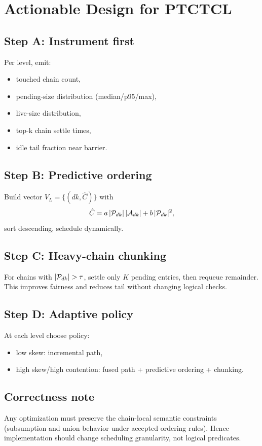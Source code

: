 \section{Actionable Design for PTCTCL}
\subsection*{Step A: Instrument first}
Per level, emit:
\begin{itemize}
  \item touched chain count,
  \item pending-size distribution (median/p95/max),
  \item live-size distribution,
  \item top-k chain settle times,
  \item idle tail fraction near barrier.
\end{itemize}

\subsection*{Step B: Predictive ordering}
Build vector $V_L=\{(dk,\hat C)\}$ with
\[
\hat C = a\,|\mathcal{P}_{dk}|\,|\mathcal{A}_{dk}| + b\,|\mathcal{P}_{dk}|^2,
\]
sort descending, schedule dynamically.

\subsection*{Step C: Heavy-chain chunking}
For chains with $|\mathcal{P}_{dk}| > \tau$, settle only $K$ pending entries, then requeue remainder.
This improves fairness and reduces tail without changing logical checks.

\subsection*{Step D: Adaptive policy}
At each level choose policy:
\begin{itemize}
  \item low skew: incremental path,
  \item high skew/high contention: fused path + predictive ordering + chunking.
\end{itemize}

\subsection*{Correctness note}
Any optimization must preserve the chain-local semantic constraints (subsumption and union behavior under accepted ordering rules).
Hence implementation should change scheduling granularity, not logical predicates.
